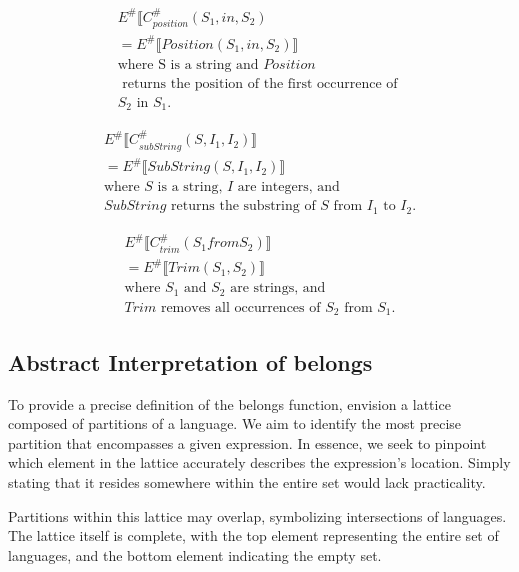 \begin{align*}
    E^\# \llbracket C_{position}^\# (S_1, in, S_2) \\
    = E^\# \llbracket Position(S_1, in, S_2) \rrbracket \\
    \text{where S is a string and } Position \\
    \text{ returns the position of the first occurrence of } \\
    S_2 \text{ in } S_1.
\end{align*}

\begin{align*}
    E^\# \llbracket C_{subString}^\# (S, I_1, I_2) \rrbracket \\
    = E^\# \llbracket SubString(S, I_1, I_2) \rrbracket \\
    \text{where } S \text{ is a string, } I \text{ are integers, and } \\
    SubString \text{ returns the substring of } S \text{ from } I_1 \text{ to } I_2.
\end{align*}

\begin{align*}
    E^\# \llbracket C_{trim}^\# (S_1 from S_2) \rrbracket \\
    = E^\# \llbracket Trim(S_1, S_2) \rrbracket \\
    \text{where } S_1 \text{ and } S_2 \text{ are strings, and }\\
    Trim \text{ removes all occurrences of } S_2 \text{ from } S_1.
\end{align*}




\subsection{Abstract Interpretation of belongs}
To provide a precise definition of the belongs function, envision a lattice composed of partitions of a language. We aim to identify the most precise partition that encompasses a given expression. In essence, we seek to pinpoint which element in the lattice accurately describes the expression's location. Simply stating that it resides somewhere within the entire set would lack practicality.

Partitions within this lattice may overlap, symbolizing intersections of languages. The lattice itself is complete, with the top element representing the entire set of languages, and the bottom element indicating the empty set.

